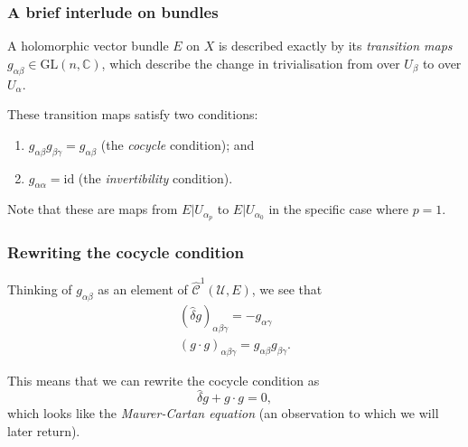 \documentclass{beamer}
\begin{document}
        \begin{frame}\frametitle{A brief interlude on bundles}
            A holomorphic vector bundle $E$ on $X$ is described exactly by its \emph{transition maps $g_{\alpha\beta}\in\mathrm{GL}(n,\mathbb{C})$}, which describe the change in trivialisation from over $U_\beta$ to over $U_\alpha$.

            \pause

            These transition maps satisfy two conditions:

            \pause
            
            \begin{enumerate}
                \item $g_{\alpha\beta}g_{\beta\gamma}=g_{\alpha\beta}$ (the \emph{cocycle} condition); and
                \pause
                \item $g_{\alpha\alpha}=\mathrm{id}$ (the \emph{invertibility} condition).
            \end{enumerate}

            \pause

            Note that these are maps from $E|U_{\alpha_p}$ to $E|U_{\alpha_0}$ in the specific case where $p=1$.
        \end{frame}

        \begin{frame}\frametitle{Rewriting the cocycle condition}
            Thinking of $g_{\alpha\beta}$ as an element of $\hat{\mathscr{C}}^1(\mathcal{U},E)$, we see that
            \begin{gather*}
                (\hat{\delta}g)_{\alpha\beta\gamma} = -g_{\alpha\gamma}\\
                (g\cdot g)_{\alpha\beta\gamma} = g_{\alpha\beta}g_{\beta\gamma}.
            \end{gather*}

            \pause

            This means that we can rewrite the cocycle condition as
            \begin{equation*}
                \hat{\delta}g + g\cdot g = 0,
            \end{equation*}
            which looks like the \emph{Maurer-Cartan equation} (an observation to which we will later return).
        \end{frame}
\end{document}
